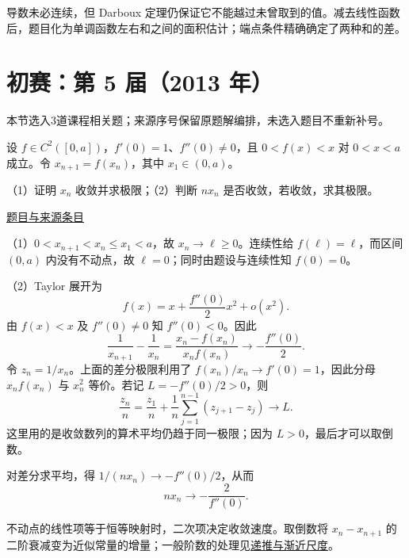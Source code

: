\documentclass[12pt,fontset=fandol]{ctexart}
\begin{document}
\begin{remark}[方法与条件]导数未必连续，但 Darboux 定理仍保证它不能越过未曾取到的值。减去线性函数后，题目化为单调函数左右和之间的面积估计；端点条件精确确定了两种和的差。\end{remark}

\section{初赛：第 5 届（2013 年）}

本节选入3道课程相关题；来源序号保留原题解编排，未选入题目不重新补号。

\begin{example}[来源序号3]\label{ex:pre05-math:3}\label{pr:pre05-math:3}

设 $f\in C^2([0,a])$，$f'(0)=1$、$f''(0)\ne0$，且 $0<f(x)<x$ 对 $0<x<a$ 成立。令 $x_{n+1}=f(x_n)$，其中 $x_1\in(0,a)$。

（1）证明 $x_n$ 收敛并求极限；（2）判断 $nx_n$ 是否收敛，若收敛，求其极限。

\par\href{https://github.com/lzxcr/cmc-mathematics/blob/64916fa1fdbc3e444a652eca204d5669058ee321/src/problems/preliminary/05/03.md}{题目与来源条目}

\end{example}

\begin{solve}\label{ans:pre05-math:3}

（1）$0<x_{n+1}<x_n\le x_1<a$，故 $x_n\to\ell\ge0$。连续性给 $f(\ell)=\ell$，而区间 $(0,a)$ 内没有不动点，故 $\ell=0$；同时由题设与连续性知 $f(0)=0$。

（2）Taylor 展开为
\[
f(x)=x+\frac{f''(0)}2x^2+o(x^2).
\]
由 $f(x)<x$ 及 $f''(0)\ne0$ 知 $f''(0)<0$。因此
\[
\frac1{x_{n+1}}-\frac1{x_n}
=\frac{x_n-f(x_n)}{x_nf(x_n)}
\longrightarrow-\frac{f''(0)}2.
\]
令 $z_n=1/x_n$。上面的差分极限利用了 $f(x_n)/x_n\to f'(0)=1$，因此分母 $x_nf(x_n)$ 与 $x_n^2$ 等价。若记 $L=-f''(0)/2>0$，则
\[
\frac{z_n}{n}=\frac{z_1}{n}+\frac1n\sum_{j=1}^{n-1}(z_{j+1}-z_j)\longrightarrow L.
\]
这里用的是收敛数列的算术平均仍趋于同一极限；因为 $L>0$，最后才可以取倒数。

对差分求平均，得 $1/(nx_n)\to-f''(0)/2$，从而
\[
\boxed{\displaystyle nx_n\longrightarrow-\frac2{f''(0)}}.
\]

\end{solve}

\begin{remark}[方法与条件]不动点的线性项等于恒等映射时，二次项决定收敛速度。取倒数将 $x_n-x_{n+1}$ 的二阶衰减变为近似常量的增量；一般阶数的处理见\hyperref[app:estimate-recursion]{递推与渐近尺度}。\end{remark}
\end{document}
